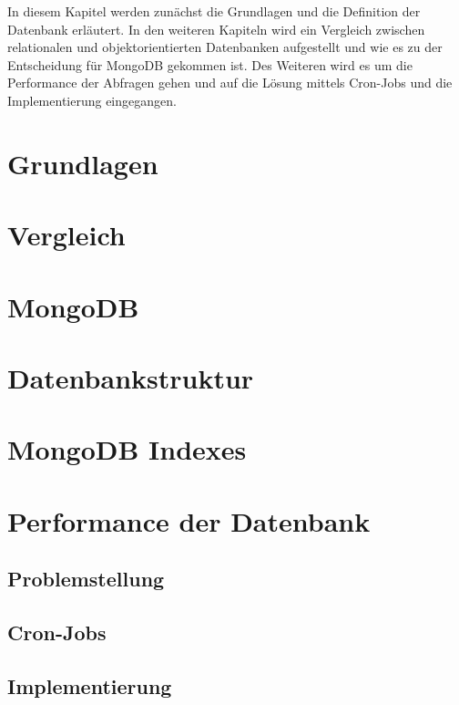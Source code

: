 In diesem Kapitel werden zunächst die Grundlagen und die Definition der Datenbank erläutert. In den weiteren Kapiteln wird ein Vergleich zwischen relationalen und objektorientierten Datenbanken aufgestellt und wie es zu der Entscheidung für MongoDB gekommen ist. Des Weiteren wird es um die Performance der Abfragen gehen und auf die Lösung mittels Cron-Jobs und die Implementierung eingegangen.

\section{Grundlagen}


\section{Vergleich}


\section{MongoDB}


\section{Datenbankstruktur}


\section{MongoDB Indexes}


\section{Performance der Datenbank}


\subsection{Problemstellung}


\subsection{Cron-Jobs}


\subsection{Implementierung}
